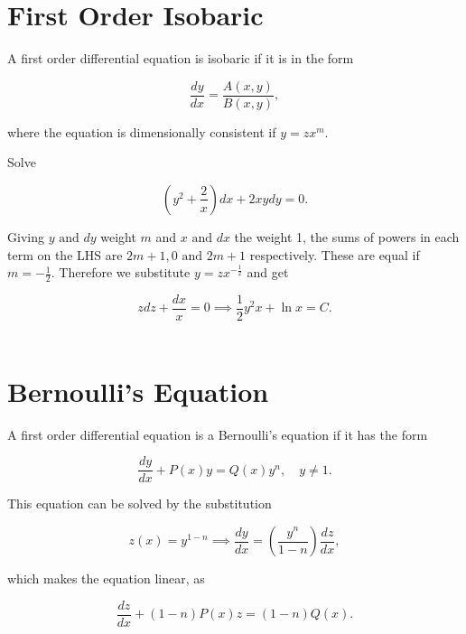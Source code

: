 \documentclass[english,a4paper,12pt]{report}
\begin{document}
\section{First Order Isobaric}

A first order differential equation is isobaric if it is in the form

\begin{equation}
    \frac{dy}{dx} = \frac{A(x,y)}{B(x,y)},  
\end{equation}

where the equation is dimensionally consistent if \(y = zx^{m} \). 

{Solve

\begin{equation}
    \left( y^2 + \frac{2}{x}  \right) dx + 2xydy = 0.
\end{equation}
}
{Giving \(y\text { and } dy\) weight \(m\) and \(x\text { and } dx\) the weight 1, the sums of powers in each term on the LHS are \(2m+1,0 \text { and } 2m+1\) respectively. These are equal if \(m = -\frac{1}{2} \). Therefore we substitute \(y = zx^{-\frac{1}{2} } \) and get

\begin{equation}
    zdz + \frac{dx}{x} = 0 \implies \frac{1}{2}y^2x + \ln x = C. 
\end{equation}~
} 

\section{Bernoulli's Equation}

A first order differential equation is a Bernoulli's equation if it has the form

\begin{equation}
    \frac{dy}{dx} + P(x)y = Q(x)y^{n}, \quad  y\neq 1.  
\end{equation}

This equation can be solved by the substitution 

\begin{equation}
    z(x) = y^{1-n} \implies \frac{dy}{dx} = \left( \frac{y^{n} }{1-n}  \right) \frac{dz}{dx},  
\end{equation}

which makes the equation linear, as

\begin{equation}
    \frac{dz}{dx} + (1-n) P(x)z = (1-n)Q(x).  
\end{equation}
\end{document}
